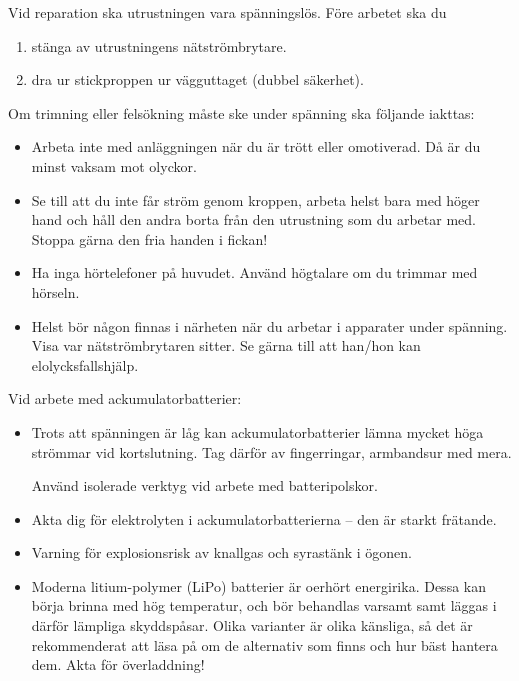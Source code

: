 
\noindent
Vid reparation ska utrustningen vara spänningslös.
Före arbetet ska du

\begin{enumerate}
  \item stänga av utrustningens nätströmbrytare.
  \item dra ur stickproppen ur vägguttaget (dubbel säkerhet).
\end{enumerate}

\noindent
Om trimning eller felsökning måste ske under spänning ska följande iakttas:
\begin{itemize}
\item Arbeta inte med anläggningen när du är trött eller omotiverad.
  Då är du minst vaksam mot olyckor.
\item Se till att du inte får ström genom kroppen, arbeta helst bara med höger
  hand och håll den andra borta från den utrustning som du arbetar med.
  Stoppa gärna den fria handen i fickan!
\item Ha inga hörtelefoner på huvudet.
  Använd högtalare om du trimmar med hörseln.
\item Helst bör någon finnas i närheten när du arbetar i apparater under
  spänning.
  Visa var nätströmbrytaren sitter.
  Se gärna till att han/hon kan elolycksfallshjälp.
\end{itemize}

\newpage

\noindent
Vid arbete med ackumulatorbatterier:

\begin{itemize}
\item Trots att spänningen är låg kan ackumulatorbatterier lämna
  mycket höga strömmar vid kortslutning.
  Tag därför av fingerringar, armbandsur med mera.

Använd isolerade verktyg vid arbete med batteripolskor.
\item Akta dig för elektrolyten i ackumulatorbatterierna -- den är
  starkt frätande.
\item Varning för explosionsrisk av knallgas och syrastänk i ögonen.
\item Moderna litium-polymer (LiPo) batterier är oerhört energirika.
  Dessa kan börja brinna med hög temperatur, och bör behandlas varsamt samt
  läggas i därför lämpliga skyddspåsar.
  Olika varianter är olika känsliga, så det är rekommenderat att läsa på om
  de alternativ som finns och hur bäst hantera dem.
  Akta för överladdning!
\end{itemize}
